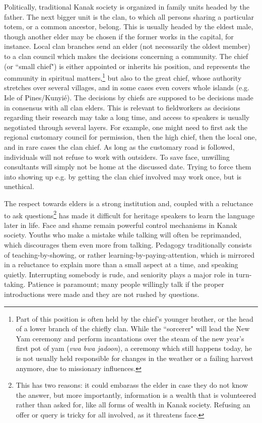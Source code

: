Politically, traditional Kanak society is organized in family units headed by the father. The next bigger unit is the clan, to which all persons sharing a particular totem, or a common ancestor, belong. This is usually headed by the eldest male, though another elder may be chosen if the former works in the capital, for instance. Local clan branches send an elder (not necessarily the oldest member) to a clan council which makes the decisions concerning a community. The chief (or ``small chief") is either appointed or inherits his position, and represents the community in spiritual matters,\footnote{Part of this position is often held by the chief's younger brother, or the head of a lower branch of the chiefly clan. While the ``sorcerer" will lead the New Yam ceremony and perform incantations over the steam of the new year's first pot of yam (\textit{vwa bwa jadoon}), a ceremony which still happens today, he is not usually held responsible for changes in the weather or a failing harvest anymore, due to missionary influences.} but also to the great chief, %
whose authority stretches over several villages, and in some cases even covers whole islands  (e.g. Isle of Pines\slash Kunyié). The decisions by chiefs are supposed to be decisions made in consensus with all clan elders. This is relevant to fieldworkers as decisions regarding their research may take a long time, and access to speakers is usually negotiated through several layers. For example, one might need to first ask the regional customary council for permission, then the high chief, then the local one, and in rare cases the clan chief. As long as the customary road is followed, individuals will not refuse to work with outsiders. To save face, unwilling consultants will simply not be home at the discussed date. Trying to force them into showing up e.g. by getting the clan chief involved may work once, but is unethical.

The respect towards elders is a strong institution and, coupled with a reluctance to ask questions\footnote{This has two reasons: it could embarass the elder in case they do not know the answer, but more importantly, information is a wealth that is volunteered rather than asked for, like all forms of wealth in Kanak society. Refusing an offer or query is tricky for all involved, as it threatens face.} has made it difficult for heritage speakers to learn the language later in life. Face and shame remain powerful control mechanisms in Kanak society. Youths who make a mistake while talking will often be reprimanded, which discourages them even more from talking. 
Pedagogy traditionally consists of teaching-by-showing, or rather learning-by-paying-attention, which is mirrored in a reluctance to explain more than a small aspect at a time, and speaking quietly. Interrupting somebody is rude, and seniority plays a major role in turn-taking. Patience is paramount; many people willingly talk if the proper introductions were made and they are not rushed by questions.

